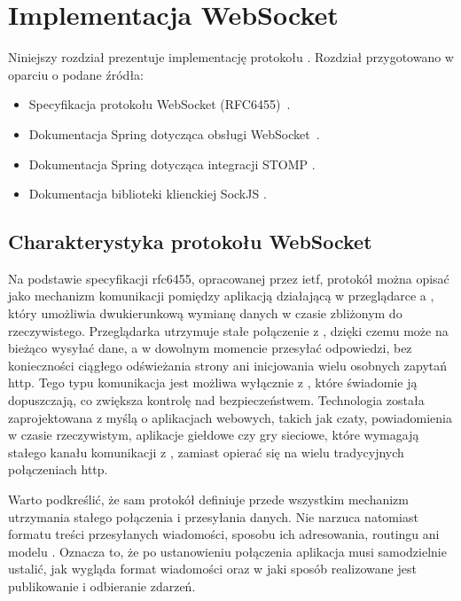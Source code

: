 \setcounter{secnumdepth}{4}
\setcounter{tocdepth}{4}


\section{Implementacja WebSocket}
\label{sec:implementacja-websocket}

Niniejszy rozdział prezentuje implementację protokołu .
Rozdział przygotowano w oparciu o podane źródła:
\begin{itemize}
    \item Specyfikacja protokołu WebSocket (RFC6455)~\cite{rfc6455}.
    \item Dokumentacja Spring dotycząca obsługi WebSocket~\cite{spring-websocket}.
    \item Dokumentacja Spring dotycząca integracji STOMP \cite{spring-stomp}.
    \item Dokumentacja biblioteki klienckiej SockJS \cite{sockjs-client}.
\end{itemize}

\subsection{Charakterystyka protokołu WebSocket}
\label{subsec:definicja-websocket}
Na podstawie specyfikacji \gls{rfc}6455, opracowanej przez \gls{ietf}, protokół
 można opisać jako mechanizm komunikacji pomiędzy aplikacją
działającą w przeglądarce a , który umożliwia dwukierunkową wymianę danych
w czasie zbliżonym do rzeczywistego.
Przeglądarka utrzymuje stałe połączenie z , dzięki czemu może
na bieżąco wysyłać dane, a  w dowolnym momencie przesyłać odpowiedzi,
bez konieczności ciągłego odświeżania strony ani inicjowania wielu osobnych zapytań \gls{http}.
Tego typu komunikacja jest możliwa wyłącznie z , które świadomie ją dopuszczają,
co zwiększa kontrolę nad bezpieczeństwem.
Technologia  została zaprojektowana z myślą o aplikacjach webowych,
takich jak czaty, powiadomienia w czasie rzeczywistym, aplikacje giełdowe czy gry sieciowe,
które wymagają stałego kanału komunikacji z , zamiast opierać się na wielu tradycyjnych
połączeniach \gls{http}.

Warto podkreślić, że sam protokół  definiuje przede wszystkim
mechanizm utrzymania stałego połączenia i przesyłania  danych.
Nie narzuca natomiast formatu treści przesyłanych wiadomości, sposobu ich adresowania, routingu ani modelu
. Oznacza to, że po ustanowieniu połączenia 
aplikacja musi samodzielnie ustalić, jak wygląda format wiadomości oraz w jaki sposób realizowane jest publikowanie
i odbieranie zdarzeń.

